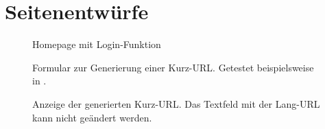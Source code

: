 \documentclass[parskip=full,11pt,twoside]{scrartcl}
\begin{document}
\pagebreak
\appendix

\section{Seitenentwürfe}


\begin{figure}[hb]
\caption{\label{fig:homepage}
Homepage mit Login-Funktion
}
\end{figure}

\begin{figure}[hb]
\caption{\label{fig:form}
Formular zur Generierung einer Kurz-URL.
Getestet beispielsweise in .
}
\end{figure}

\begin{figure}[hb]
\caption{\label{fig:generated}
Anzeige der generierten Kurz-URL.
Das Textfeld mit der Lang-URL kann nicht geändert werden.
}
\end{figure}
\end{document}
